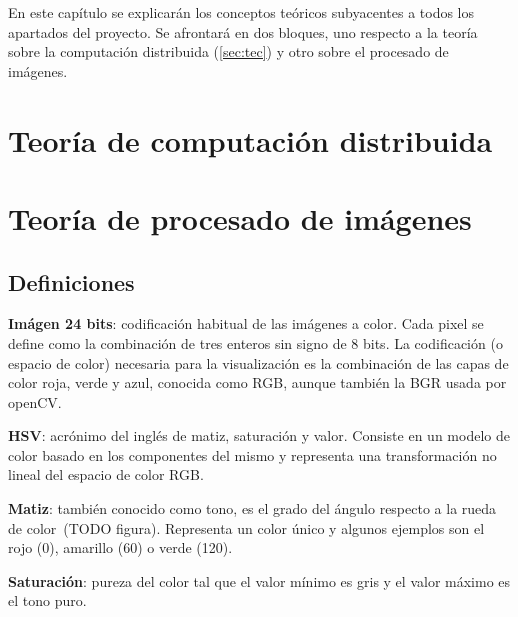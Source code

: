 

En este capítulo se explicarán los conceptos teóricos subyacentes a todos los apartados del proyecto. Se afrontará en dos bloques, uno respecto a la teoría sobre la computación distribuida (\autoref{sec:tec}) y otro sobre el procesado de imágenes.

\section{Teoría de computación distribuida}\label{sec:tecdis}

\section{Teoría de procesado de imágenes}\label{sec:teccv}



\subsection{Definiciones}

\textbf{Imágen 24 bits}: codificación habitual de las imágenes a color. Cada pixel se define como la combinación de tres enteros sin signo de 8 bits. La codificación (o espacio de color) necesaria para la visualización es la combinación de las capas de color roja, verde y azul, conocida como RGB, aunque también la BGR usada por openCV. 

\textbf{HSV}: acrónimo del inglés de matiz, saturación y valor. Consiste en un modelo de color basado en los componentes del mismo y representa una transformación no lineal del espacio de color RGB.

\textbf{Matiz}: también conocido como tono, es el grado del ángulo respecto a la rueda de color~(TODO figura). Representa un color único y algunos ejemplos son el rojo (0\grado), amarillo (60\grado) o verde (120\grado).

\textbf{Saturación}: pureza del color tal que el valor mínimo es gris y el valor máximo es el tono puro. 